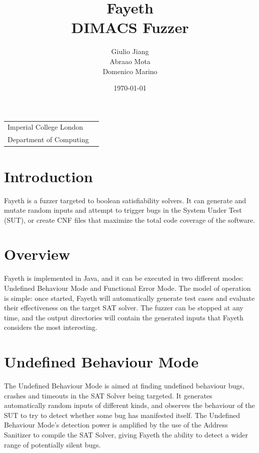 \documentclass{article}
\title{Fayeth \\ DIMACS Fuzzer} %
\author{Giulio Jiang \\ Abraao Mota \\ Domenico Marino} %
\date{\today} %
\begin{document}
\maketitle %

\begin{center}
\begin{tabular}{l r}
Imperial College London \\
Department of Computing \\
\end{tabular}
\end{center}


\newpage



\section{Introduction}

Fayeth is a fuzzer targeted to boolean satisfiability solvers. It can generate and mutate 
random inputs and attempt to trigger bugs in the System Under Test (SUT), or create CNF files 
that maximize the total code coverage of the software.

\section{Overview}

Fayeth is implemented in Java, and it can be executed in two different modes: 
Undefined Behaviour Mode and Functional Error Mode. The model of operation is simple: 
once started, Fayeth will automatically generate test cases and evaluate their 
effectiveness on the target SAT solver. The fuzzer can be stopped at any time, 
and the output directories will contain the generated inputs that Fayeth considers 
the most interesting.

\section{Undefined Behaviour Mode}

The Undefined Behaviour Mode is aimed at finding undefined behaviour bugs, crashes and timeouts in the
SAT Solver being targeted. It generates automatically random inputs of different kinds,
and observes the behaviour of the SUT to try to detect whether some bug has manifested itself.
The Undefined Behaviour Mode's detection power is amplified by the use of the Address
Sanitizer to compile the SAT Solver, giving Fayeth the ability to detect a wider range of
potentially silent bugs.\\
\end{document}
